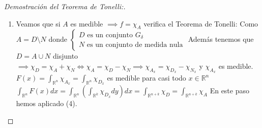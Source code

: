 \begin{proof}[Demostración del Teorema de Tonelli:]
\begin{enumerate}
Veamos que el Teorema de Tonelli se verifia cuando $f = \chi_N : N \subset
    \mathbb{R}^{n+k}$ es un conjunto de medida nula. \\ Supongamos entonce que
$m_{n+k}(N) = 0 \implies \forall j \in \mathbb{N}$ por la regularidad $\exists
    G_j \subset \mathbb{R}^{n+k}$-abierto con $N \subset G_j \text{ y }
    m_{n+k}(G_j) < \frac{1}{j}$. \\ Entonces, sea $G = \bigcup_{j \in
        \mathbb{N}}G_j$ que es un conjunto $G_{\delta}$ y $m_{n+k}(G) \leq m_{n+k}(G_j)
    < \frac{1}{j} \to 0$. \\ Luego $N \subset G$ y $m_{(n+k)}(G) = 0 \implies
    \text{por el apartado anterior } \chi_G$ satisface el Teorema de Tonelli. \\
Por último tenemos que $0 = m_{(n+k)(G)} = \int_{\mathbb{R}^{n+k}}\chi_G =
    \int_{\mathbb{R}^n}(\int_{\mathbb{R}^k}\chi_{N_x} dy)dx$. Sabemos que para casi
todo $x \in \mathbb{R}^n \ \widehat{F}(x)$ es medible y
$\int_{\mathbb{R}^n}\widehat{F}(x)dx = 0 \implies \widehat{F}(x) = 0$ en casi
todo punto de $\mathbb{R}^n$. Como $N_x = \{y \in \mathbb{R}^k : (x,y) \in N\}
    \subset G_x$ y $m_k(G_x) = \widehat{R}(x) = 0 \implies$ $N_x$ es un conjunto
nulo (luego medible) para casi todo $x \in \mathbb{R}^n$ es decir $\chi_{N_x}$
es medible. Además $0 \leq F(x) = \int_{\mathbb{R}^n} \chi_{N_x} \leq
    \int_{\mathbb{R}^n}\chi_{G_x} = 0 \implies F(x) = \int_{\mathbb{R}^n}\chi_{N_x}
    = 0$ en casi todo punto $x \in \mathbb{R}^n$ en particualr F es medible.
Finalmente, $0 = \int_{\mathbb{R}^{n+k}} \chi_N = \mathbb{R^n}F(x) dx =
    \int_{\mathbb{R}}^n(\int_{\mathbb{R}^k}\chi_{N_x}dy)dx$
\item Veamos que si $A$ es medible $\implies f = \chi_A$ verifica el Teorema de
Tonelli: Como $A = D \setminus N$ donde $\begin{cases}
        D \text{ es un conjunto } G_{\delta} \\
        N \text{ es un conjunto de medida nula}
    \end{cases}$ Además tenemos que $D = A \cup N$ disjunto $\implies \chi_D = \chi_A + \chi_N \iff \chi_A = \chi_D - \chi_N \implies \chi_{A_x} = \chi_{D_x} - \chi_{N_x}$ y $\chi_{A_x}$ es medible. \\
$F(x) = \int_{\mathbb{R}^n}\chi_{A_x} = \int_{\mathbb{R}^n}\chi_{D_x}$ es medible para casi todo $x \in \mathbb{R}^n$
$\int_{\mathbb{R}^n}F(x)dx = \int_{\mathbb{R}^n}(\int_{\mathbb{R}^k}\chi_{D_x}dy)dx = \int_{\mathbb{R}^{n+k}}\chi_D = \int_{\mathbb{R}^{n+k}}\chi_A$ En este paso hemos aplicado (4).


\end{enumerate}
\end{proof}
